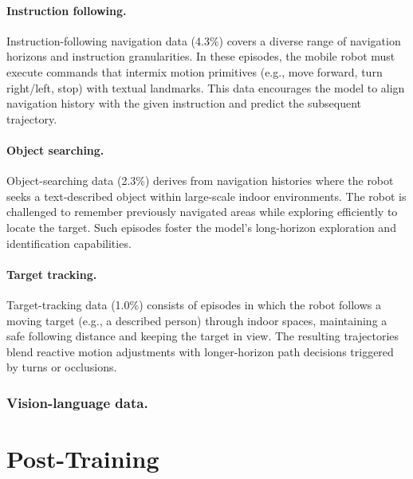 \documentclass{article}
\begin{document}
\paragraph{Instruction following.} Instruction-following navigation data (4.3\%) covers a diverse range of navigation horizons and instruction granularities. In these episodes, the mobile robot must execute commands that intermix motion primitives (e.g., move forward, turn right/left, stop) with textual landmarks. This data encourages the model to align navigation history with the given instruction and predict the subsequent trajectory.

\paragraph{Object searching.} Object-searching data (2.3\%) derives from navigation histories where the robot seeks a text-described object within large-scale indoor environments. The robot is challenged to remember previously navigated areas while exploring efficiently to locate the target. Such episodes foster the model's long-horizon exploration and identification capabilities.

\paragraph{Target tracking.} Target-tracking data (1.0\%) consists of episodes in which the robot follows a moving target (e.g., a described person) through indoor spaces, maintaining a safe following distance and keeping the target in view. The resulting trajectories blend reactive motion adjustments with longer-horizon path decisions triggered by turns or occlusions.


\subsubsection{Vision-language data.}




\section{Post-Training}
\label{sec:post-training}
\end{document}
